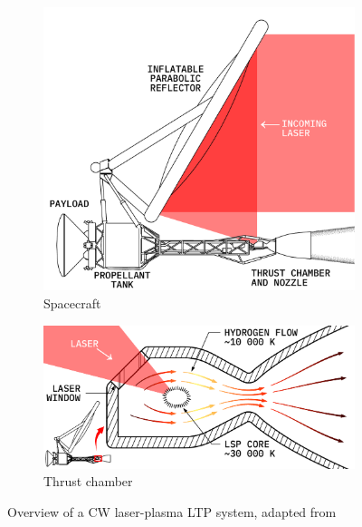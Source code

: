        \begin{figure}[t]
            \centering
            \begin{subfigure}[t]{0.64\textwidth}
                \centering
                \includegraphics[width=\textwidth]{assets/2 background/overview_ltp.pdf}
                \caption{Spacecraft}
                \label{fig:overview_spacecraft}
            \end{subfigure}
            \begin{subfigure}[t]{0.64\textwidth}
                \centering
                \includegraphics[width=\textwidth]{assets/2 background/chamber.pdf}
                \caption{Thrust chamber}
                \label{fig:overview_chamber}
            \end{subfigure}
            \caption[Overview of a CW laser-plasma LTP system]{Overview of a CW laser-plasma LTP system, adapted from \textcite{duplayDesignRapidTransit2022}}
            \label{fig:overview}
        \end{figure}

